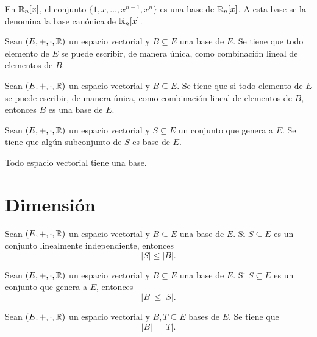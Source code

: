\documentclass[a4,11pt]{aleph-notas}
\begin{document}
\begin{teo}
    En $\mathbb{R}_n[x]$, el conjunto $\{1,x,\ldots,x^{n-1},x^n\}$ es una base de $\mathbb{R}_n[x]$. A esta base se la denomina la base canónica de $\mathbb{R}_n[x]$.
\end{teo}

\begin{teo}
    Sean $(E,+,\cdot,\mathbb{R})$ un espacio vectorial y $B\subseteq E$ una base de $E$. Se tiene que todo elemento de $E$ se puede escribir, de manera única, como combinación lineal de elementos de $B$.
\end{teo}

\begin{teo}
    Sean $(E,+,\cdot,\mathbb{R})$ un espacio vectorial y $B\subseteq E$. Se tiene que si todo elemento de $E$ se puede escribir, de manera única, como combinación lineal de elementos de $B$, entonces $B$ es una base de $E$.
\end{teo}


\begin{teo}
    Sean $(E,+,\cdot,\mathbb{R})$ un espacio vectorial y $S\subseteq E$ un conjunto que genera a $E$. Se tiene que algún subconjunto de $S$ es base de $E$.
\end{teo}


\begin{teo}
    Todo espacio vectorial tiene una base.
\end{teo}

\section{Dimensión}


\begin{teo}
    Sean $(E,+,\cdot,\mathbb{R})$ un espacio vectorial y $B\subseteq E$ una base de $E$. Si $S\subseteq E$ es un conjunto linealmente independiente, entonces 
    \[
        |S|\leq |B|.
    \]
\end{teo}

\begin{teo}
    Sean $(E,+,\cdot,\mathbb{R})$ un espacio vectorial y $B\subseteq E$ una base de $E$. Si $S\subseteq E$ es un conjunto que genera a $E$, entonces 
    \[
        |B|\leq |S|.
    \]
\end{teo}


\begin{teo}
    Sean $(E,+,\cdot,\mathbb{R})$ un espacio vectorial y $B,T\subseteq E$ bases de $E$. Se tiene que
    \[
        |B|=|T|.
    \]
\end{teo}
\end{document}
